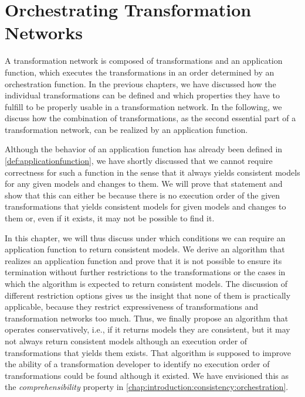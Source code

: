 \chapter{Orchestrating Transformation Networks 
}
\label{chap:orchestration}

A transformation network is composed of transformations and an application function, which executes the transformations in an order determined by an orchestration function.
In the previous chapters, we have discussed how the individual transformations can be defined and which properties they have to fulfill to be properly usable in a transformation network.
In the following, we discuss how the combination of transformations, as the second essential part of a transformation network, can be realized by an application function.

Although the behavior of an application function has already been defined in \autoref{def:applicationfunction}, we have shortly discussed that we cannot require correctness for such a function in the sense that it always yields consistent models for any given models and changes to them.
We will prove that statement and show that this can either be because there is no execution order of the given transformations that yields consistent models for given models and changes to them or, even if it exists, it may not be possible to find it.

In this chapter, we will thus discuss under which conditions we can require an application function to return consistent models.
We derive an algorithm that realizes an application function and prove that it is not possible to ensure its termination without further restrictions to the transformations or the cases in which the algorithm is expected to return consistent models.
The discussion of different restriction options gives us the insight that none of them is practically applicable, because they restrict expressiveness of transformations and transformation networks too much.
Thus, we finally propose an algorithm that operates conservatively, i.e., if it returns models they are consistent, but it may not always return consistent models although an execution order of transformations that yields them exists.
That algorithm is supposed to improve the ability of a transformation developer to identify no execution order of transformations could be found although it existed.
We have envisioned this as the \emph{comprehensibility} property in \autoref{chap:introduction:consistency:orchestration}.

